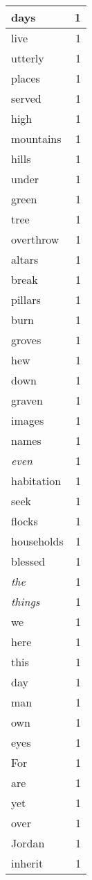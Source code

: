 \begin{center}
\begin{longtable}{l|r}
days & 1 \\ \hline
live & 1 \\ \hline
utterly & 1 \\ \hline
places & 1 \\ \hline
served & 1 \\ \hline
high & 1 \\ \hline
mountains & 1 \\ \hline
hills & 1 \\ \hline
under & 1 \\ \hline
green & 1 \\ \hline
tree & 1 \\ \hline
overthrow & 1 \\ \hline
altars & 1 \\ \hline
break & 1 \\ \hline
pillars & 1 \\ \hline
burn & 1 \\ \hline
groves & 1 \\ \hline
hew & 1 \\ \hline
down & 1 \\ \hline
graven & 1 \\ \hline
images & 1 \\ \hline
names & 1 \\ \hline
\emph{even} & 1 \\ \hline
habitation & 1 \\ \hline
seek & 1 \\ \hline
flocks & 1 \\ \hline
households & 1 \\ \hline
blessed & 1 \\ \hline
\emph{the} & 1 \\ \hline
\emph{things} & 1 \\ \hline
we & 1 \\ \hline
here & 1 \\ \hline
this & 1 \\ \hline
day & 1 \\ \hline
man & 1 \\ \hline
own & 1 \\ \hline
eyes & 1 \\ \hline
For & 1 \\ \hline
are & 1 \\ \hline
yet & 1 \\ \hline
over & 1 \\ \hline
Jordan & 1 \\ \hline
inherit & 1 \\ \hline

\end{longtable}
\end{center}
